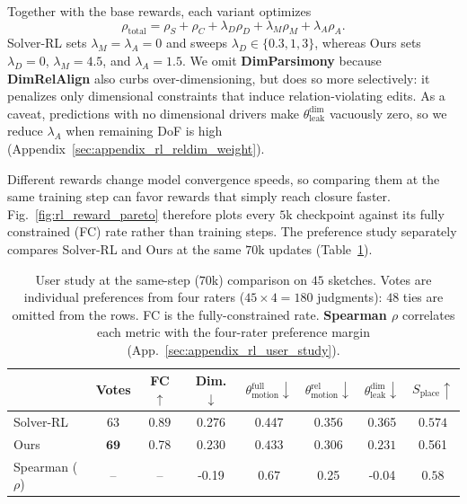 Together with the base rewards, each variant optimizes
\begin{equation}
    \rho_{\mathrm{total}}
    =
    \rho_S + \rho_C
    + \lambda_D \rho_D
    + \lambda_M \rho_M
    + \lambda_A \rho_A .
    \label{eq:rl_total_reward}
\end{equation}
Solver-RL sets $\lambda_M=\lambda_A=0$ and sweeps $\lambda_D\in\{0.3,1,3\}$, whereas Ours sets $\lambda_D=0$, $\lambda_M=4.5$, and $\lambda_A=1.5$. We omit \textbf{DimParsimony} because \textbf{DimRelAlign} also curbs over-dimensioning, but does so more selectively: it penalizes only dimensional constraints that induce relation-violating edits. As a caveat, predictions with no dimensional drivers make $\theta_\mathrm{leak}^\mathrm{dim}$ vacuously zero, so we reduce $\lambda_A$ when remaining DoF is high (Appendix~\ref{sec:appendix_rl_reldim_weight}).

Different rewards change model convergence speeds, so comparing them at the same training step can favor rewards that simply reach closure faster. Fig.~\ref{fig:rl_reward_pareto} therefore plots every $5$k checkpoint against its fully constrained (FC) rate rather than training steps. The preference study separately compares Solver-RL and Ours at the same $70$k updates (Table~\ref{tab:rl_user_study}).

\begin{table}[t]
    \centering
    \scriptsize
    \renewcommand{\arraystretch}{1.0}
    \setlength{\tabcolsep}{1.35pt}
    \begin{tabular}{@{}lccccccc@{}}
        \toprule
        & Votes
        & FC $\uparrow$
        & Dim. $\downarrow$
        & $\theta_{\mathrm{motion}}^{\mathrm{full}}\!\downarrow$
        & $\theta_{\mathrm{motion}}^{\mathrm{rel}}\!\downarrow$
        & $\theta_{\mathrm{leak}}^{\mathrm{dim}}\!\downarrow$
        & $S_{\mathrm{place}}\!\uparrow$ \\
        \midrule
        Solver-RL & 63 & $\mathbf{0.89}$ & 0.276 & 0.447 & 0.356 & 0.365 & $\mathbf{0.574}$ \\
        Ours & $\mathbf{69}$ & 0.78 & $\mathbf{0.230}$ & $\mathbf{0.433}$ & $\mathbf{0.306}$ & $\mathbf{0.231}$ & 0.561            \\
        \midrule
        Spearman ($\rho$) & -- & -- & -0.19 & $\mathbf{0.67}$ & 0.25 & -0.04 & $\mathbf{0.58}$  \\
        \bottomrule
    \end{tabular}
    \vspace{0.15em}
    \caption{User study at the same-step ($70$k) comparison on $45$ sketches. Votes are individual preferences from four raters ($45\times 4 = 180$ judgments): $48$ ties are omitted from the rows. FC is the fully-constrained rate. \textbf{Spearman $\rho$} correlates each metric with the four-rater preference margin (App.~\ref{sec:appendix_rl_user_study}).}
    \label{tab:rl_user_study}
\end{table}


